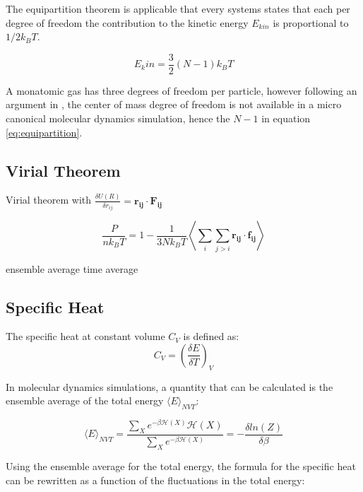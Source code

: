 \documentclass[
10pt, %
a4paper, %
oneside, %
headinclude,footinclude, %
BCOR5mm, %
]{scrartcl}
\begin{document}
The equipartition theorem is applicable that every systems  states that each per degree of freedom the contribution to the kinetic energy $E_{kin}$ is proportional to $1/2 k_B T$.
 
 \begin{equation} 
 \label{eq:equipartition}
 E_kin = \frac{3}{2} (N - 1) k_B T
 \end{equation}
 
A monatomic gas has three degrees of freedom per particle, 
however following an argument in \cite{Thijssen:2013cp}, the center of mass degree of freedom is not available in a micro canonical molecular dynamics simulation, hence the $N-1$ in equation \ref{eq:equipartition}.

\subsection{Virial Theorem}

Virial theorem with $\frac{\delta U(R)}{\delta r_{ij}} = \mathbf{r_{ij}} \cdot \mathbf{F_{ij}}$

\begin{equation} \frac{P}{nk_BT} = 1 - \frac{1}{3Nk_BT} \left \langle \sum_i \sum_{j>i} \mathbf{r_{ij}} \cdot \mathbf{f_{ij}} \right \rangle \end{equation}

ensemble average 
time average

\subsection{Specific Heat}

The specific heat at constant volume $C_V$  is defined as:
\begin{equation} C_V = \left ( \frac{\delta E}{\delta T} \right )_V \end{equation}

\noindent
In molecular dynamics simulations, a quantity that can be calculated is the ensemble average of the total energy $\langle E\rangle_{NVT}$:

\begin{equation} \langle E\rangle_{NVT} = \frac{ \sum_X e^{-\beta \mathcal{H}(X)} \mathcal{H}(X)}{ \sum_X e^{-\beta \mathcal{H}(X)}} = - \frac{\delta ln(Z)}{\delta \beta} \end{equation}

\noindent
Using the ensemble average for the total energy, the formula for the specific heat can be rewritten as a function of the fluctuations in the total energy:
\end{document}
